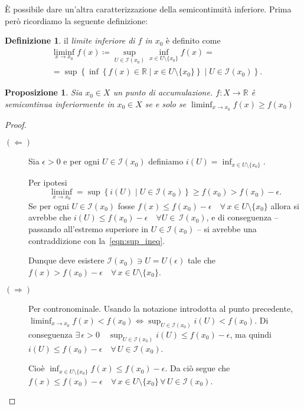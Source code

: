 \documentclass[a4paper, 11pt]{article}
\newcommand{\R}{\mathbb{R}}
\newcommand{\I}[1]{\mathcal{I}(#1)}
\theoremstyle{plain} 	%
\newtheorem{proposizione}{Proposizione}
\theoremstyle{definition}
\newtheorem{definizione}{Definizione}
\theoremstyle{remark}
\begin{document}
    \`E possibile dare un'altra caratterizzazione della semicontinuità inferiore. Prima però ricordiamo la seguente definizione:
    \begin{definizione} il \emph{limite inferiore di $f$ in $x_0$} è definito come
        \begin{align*}
            & \liminf_{x\to x_0}f(x)\coloneqq\sup_{U\in\I{x_0}}\inf_{x\in U\setminus\{x_0\}} f(x)=\\
            & =\sup\left\{\inf\left\{f(x)\in\R\mid x\in U\setminus\{x_0\}\right\}\mid U\in\I{x_0}\right\}.            
        \end{align*}
    \end{definizione}
    \begin{proposizione}\label{prop:liminf}
        Sia $x_0\in X$ un punto di accumulazione. $f\colon X\to\R$ è semicontinua inferiormente in $x_0\in X$ se e solo se $\liminf_{x\to x_0}f(x)\ge f(x_0)$
    \end{proposizione}
    \begin{proof}
        \begin{description}
            \item[$\left(\Longleftarrow\right)$] 
            Sia $\epsilon>0$ e per ogni $U\in\I{x_0}$ definiamo $i(U)=\inf_{x\in U\setminus\{x_0\}}$.

            Per ipotesi 
            \begin{equation}\label{eqn:sup_ineq}
                \liminf_{x\to x_0}=\sup\left\{i(U)\mid U\in\I{x_0}\right\}\ge f(x_0)>f(x_0)-\epsilon.
            \end{equation}
            Se per ogni $U\in\I{x_0}$ fosse $f(x)\le f(x_0)-\epsilon\quad\forall\,x\in U\setminus\{x_0\}$ allora si avrebbe che $i(U)\le f(x_0)-\epsilon\quad\forall U\in\,\I{x_0}$, e di conseguenza -- passando all'estremo superiore in $U\in\I{x_0}$ -- si avrebbe una contraddizione con la~\eqref{eqn:sup_ineq}.

            Dunque deve esistere $\I{x_0}\ni U=U(\epsilon)$ tale che $f(x)>f(x_0)-\epsilon\quad\forall\,x\in U\setminus\{x_0\}$.
            \item[$\left(\Longrightarrow\right)$] Per contronominale. Usando la notazione introdotta al punto precedente, $\liminf_{x\to x_0}f(x)<f(x_0)\iff\sup_{U\in\I{x_0}}i(U)<f(x_0)$. Di conseguenza $\exists\,\epsilon>0\quad\sup_{U\in\I{x_0}}i(U)\le f(x_0)-\epsilon$, ma quindi $i(U)\le f(x_0)-\epsilon\quad\forall\,U\in\I{x_0}$.

            Cioè $\inf_{x\in U\setminus\{x_0\}}f(x)\le f(x_0)-\epsilon$. Da ciò segue che $f(x)\le f(x_0)-\epsilon\quad\forall\,x\in U\setminus\{x_0\}\,\forall\,U\in\I{x_0}$.\qedhere
        \end{description}
    \end{proof}
\end{document}

